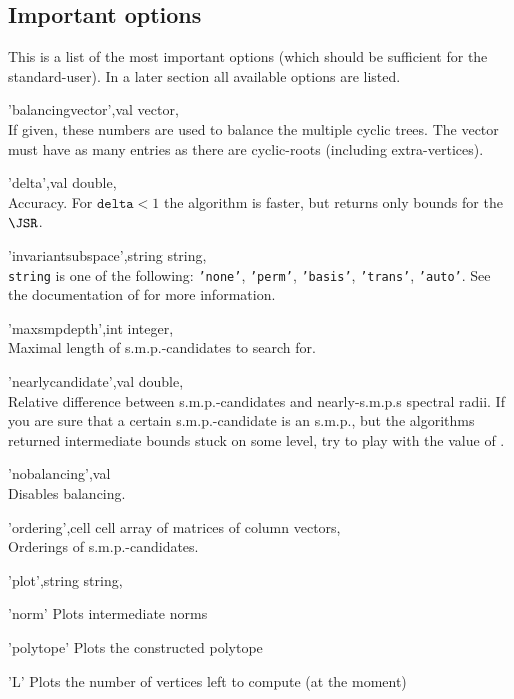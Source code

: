 \subsection{Important options}
This is a list of the most important options (which should be sufficient for the standard-user). In a later section all available options are listed.
\begin{param}


\item['balancingvector',val] vector, \\If given, these numbers are used to balance the multiple cyclic trees. The vector must have as many entries as there are cyclic-roots (including extra-vertices). 

\item['delta',val] double, \\Accuracy. For $\texttt{delta}<1$ the algorithm is faster, but returns only bounds for the $\JSR$.

\item['invariantsubspace',string] string, \\  \texttt{string} is one of the following:
\texttt{'none'}, \texttt{'perm'}, \texttt{'basis'}, \texttt{'trans'}, \texttt{'auto'}. See the documentation of  for more information.

\item['maxsmpdepth',int] integer, \\Maximal length of s.m.p.-candidates to search for.
    
\item['nearlycandidate',val] double, \\Relative difference between s.m.p.-candidates and nearly-s.m.p.s spectral radii.
If you are sure that a certain s.m.p.-candidate is an s.m.p., 
but the algorithms returned intermediate bounds stuck on some level, try to play with the value of .

\item['nobalancing',val] \\Disables balancing.

\item['ordering',cell] cell array of matrices of column vectors, \\ Orderings of s.m.p.-candidates.    

\item['plot',string] string, 
    \begin{param}
    \item['norm'] Plots intermediate norms
    \item['polytope'] Plots the constructed polytope
    \item['L'] Plots the number of vertices left to compute (at the moment)
    \end{param}



\end{param}
